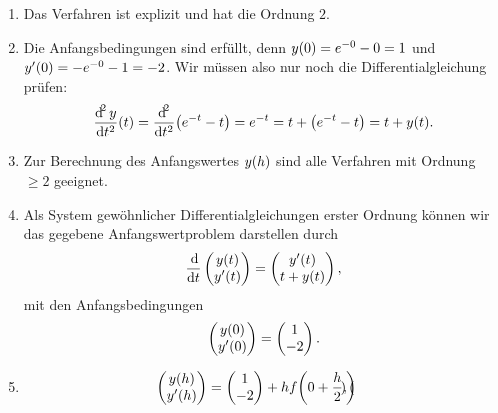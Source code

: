 \documentclass{exercise}
\begin{document}
    \begin{enumerate}
        \item Das Verfahren ist explizit und hat die Ordnung \(2\).
        \item Die Anfangsbedingungen sind erfüllt, denn \(y\parentheses*{0} = e^{-0} - 0 = 1\) und \(y'\parentheses*{0} = -e^{-0} - 1 = -2\).
        Wir müssen also nur noch die Differentialgleichung prüfen:
        \[
            \frac{\d^2 y}{\d t^2}\parentheses*{t} = \frac{\d^2}{\d t^2}\parentheses*{e^{-t} - t} = e^{-t} = t + \parentheses*{e^{-t} - t} = t + y\parentheses*{t}.
        \]
        \item Zur Berechnung des Anfangswertes \(y\parentheses*{h}\) sind alle Verfahren mit Ordnung \(\ge 2\) geeignet.
        \item Als System gewöhnlicher Differentialgleichungen erster Ordnung können wir das gegebene Anfangswertproblem darstellen durch
        \[
            \frac{\d}{\d t}\begin{pmatrix}
                y\parentheses*{t}\\
                y'\parentheses*{t}
            \end{pmatrix} = \begin{pmatrix}
                y'\parentheses*{t}\\
                t + y\parentheses*{t}
            \end{pmatrix},
        \]
        mit den Anfangsbedingungen
        \[
            \begin{pmatrix}
                y\parentheses*{0}\\
                y'\parentheses*{0}
            \end{pmatrix} = \begin{pmatrix}
                1\\
                -2
            \end{pmatrix}.
        \]
        \item
        \begin{align*}
            \begin{pmatrix}
                y\parentheses*{h}\\
                y'\parentheses*{h}
            \end{pmatrix} &= \begin{pmatrix}
                1\\
                -2
            \end{pmatrix} + hf\parentheses*{0 + \frac{h}{2}, \begin{pmatrix}

\end{pmatrix}}
\end{align*}
\end{enumerate}
\end{document}
